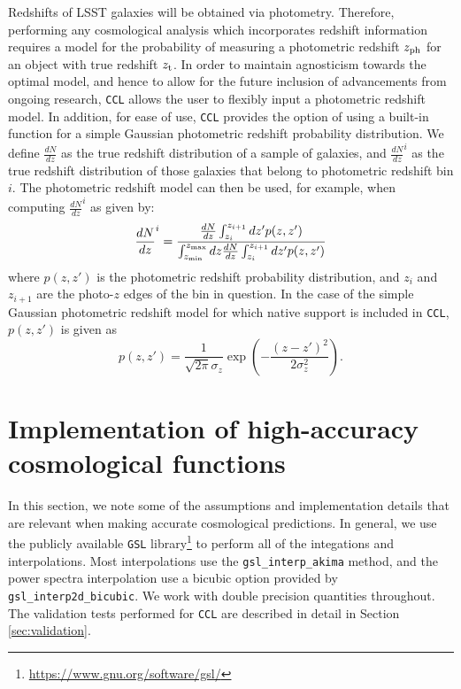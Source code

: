\documentclass[\docopts]{\docclass}
\newcommand{\ccl}{{\tt CCL}\xspace}
\begin{document}
Redshifts of LSST galaxies will be obtained via photometry. Therefore, performing any cosmological analysis which incorporates redshift information requires a model for the probability of measuring a photometric redshift $z_{\rm ph}$ for an object with true redshift $z_{\rm t}$.  In order to maintain agnosticism towards the optimal model, and hence to allow for the future inclusion of advancements from ongoing research, \ccl allows the user to flexibly input a photometric redshift model. In addition, for ease of use, \ccl provides the option of using a built-in function for a simple Gaussian photometric redshift probability distribution. We define $\frac{dN}{dz}$ as the true redshift distribution of a sample of galaxies, and $\frac{dN}{dz}^i$ as the true redshift distribution of those galaxies that belong to photometric redshift bin $i$. The photometric redshift model can then be used, for example, when computing $\frac{dN}{dz}^i$ as given by:
\begin{equation}
\frac{dN}{dz}^i = \frac{\frac{dN}{dz}\int_{z_i}^{z_{i+1}} dz' p(z,z')}{\int_{z_{\rm min}}^{z_{\rm max}}dz \frac{dN}{dz} \int_{z_i}^{z_{i+1}}dz' p(z, z')}
\label{photoz}
\end{equation}
where $p(z,z')$ is the photometric redshift probability distribution, and $z_{i}$ and $z_{i+1}$ are the photo-$z$ edges of the bin in question. In the case of the simple Gaussian photometric redshift model for which native support is included in \ccl , $p(z, z')$ is given as
\begin{equation}
p(z,z') = \frac{1}{\sqrt{2 \pi}\sigma_z} \exp\left(-\frac{(z-z')^2}{2\sigma_z^2}\right).
\label{pz_gauss}
\end{equation}

\section{Implementation of high-accuracy cosmological functions}
\label{sec:implement}

In this section, we note some of the assumptions and implementation details that are relevant when making accurate cosmological predictions. In general, we use the publicly available {\tt GSL} library\footnote{\url{https://www.gnu.org/software/gsl/}} to perform all of the integations and interpolations. Most interpolations use the {\tt gsl\_interp\_akima} method, and the power spectra interpolation use a bicubic option provided by {\tt gsl\_interp2d\_bicubic}. We work with double precision quantities throughout. The validation tests performed for {\tt CCL} are described in detail in Section \ref{sec:validation}.
\end{document}
